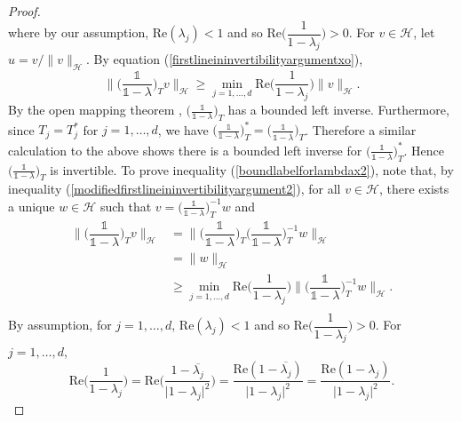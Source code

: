 \documentclass[11pt, reqno]{amsart}
\newcommand\1{\boldsymbol {1}}
\numberwithin{equation}{section}
\begin{document}
\begin{proof}
\begin{equation}
\end{equation}
where by our assumption, $\mathrm{Re}(\lambda_{j})<1$ and so $\mathrm{Re}\bigg(\dfrac{1}{1-\lambda_{j}}\bigg) >0$. For $v\in\mathcal{H}$, let $u = v/\|v\|_{\mathcal{H}}$. By equation (\ref{firstlineininvertibilityargumentxo}),
\begin{equation}\label{modifiedfirstlineininvertibilityargument2}
\bigg\| \bigg(\dfrac{\mathds{1}}{\mathds{1}-\lambda}\bigg)_{T}v \bigg\|_{\mathcal{H}}\geq \underset{j=1,\hdots, d}{\min}\mathrm{Re}\bigg(\dfrac{1}{1-\lambda_{j}}\bigg) \| v\|_{\mathcal{H}}.
\end{equation} 
 By the open mapping theorem \cite[Theorem 4.43]{RynneYoungson}, 
 $\big(\frac{\mathds{1}}{\mathds{1}-\lambda}\big)_{T}$ has a bounded left inverse. Furthermore, since $T_{j}=T_{j}^{*}$ for $j=1,\hdots,d$, we have $\big(\frac{\mathds{1}}{\mathds{1}-\lambda}\big)_{T}^{*} = \big(\frac{\mathds{1}}{\mathds{1}-\overline{\lambda}}\big)_{T}$. Therefore a similar calculation to the above shows there is a bounded left inverse for $\big(\frac{\mathds{1}}{\mathds{1}-\lambda}\big)_{T}^{*}$. Hence $\big(\frac{\mathds{1}}{\mathds{1}-\lambda}\big)_{T}$ is invertible. To prove inequality (\ref{boundlabelforlambdax2}), note that, by inequality (\ref{modifiedfirstlineininvertibilityargument2}), for all $v \in\mathcal{H}$, there exists a unique $w \in\mathcal{H}$ such that $v=\big(\frac{\mathds{1}}{\mathds{1}-\lambda}\big)_{T}^{-1}w$ and
\begin{align}
\bigg\| \bigg(\dfrac{\mathds{1}}{\mathds{1}-\lambda}\bigg)_{T} v \bigg\|_{\mathcal{H}} 	& = \bigg\|\bigg(\dfrac{\mathds{1}}{\mathds{1}-\lambda}\bigg)_{T} \bigg(\dfrac{\mathds{1}}{\mathds{1}-\lambda}\bigg)_{T}^{-1}w \bigg\|_{\mathcal{H}} \nonumber \\
						& = \| w \|_{\mathcal{H}} \nonumber \\
						&\geq \underset{j=1,\hdots, d}{\min}\mathrm{Re}\bigg(\dfrac{1}{1-\lambda_{j}}\bigg)\bigg\| \bigg(\dfrac{\mathds{1}}{\mathds{1}-\lambda}\bigg)_{T}^{-1}w\bigg\|_{\mathcal{H}} \label{invertibleoperatorboundsforprojection2}. \\ \nonumber
\end{align}
By assumption, for $j=1,\hdots,d$, $\mathrm{Re}(\lambda_{j})<1$ and so $\mathrm{Re}\bigg(\dfrac{1}{1-\lambda_{j}}\bigg)>0$. For $j=1,\hdots,d$, 
\begin{equation}\label{realpartofoperator1minuslambda}
\mathrm{Re}\bigg(\dfrac{1}{1-\lambda_{j}}\bigg)= \mathrm{Re}\bigg(\dfrac{1-\overline{\lambda_{j}}}{\lvert 1-\lambda_{j}\rvert^{2}}\bigg)= \dfrac{\mathrm{Re}(1-\overline{\lambda_{j}})}{\lvert 1-\lambda_{j}\rvert^{2}}= \dfrac{\mathrm{Re}(1-\lambda_{j})}{\lvert 1-\lambda_{j}\rvert^{2}}.

\end{equation}
\end{proof}
\end{document}
